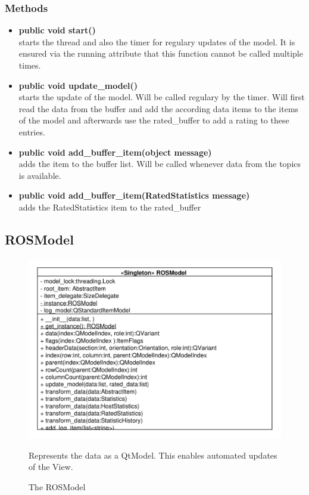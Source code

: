 \subsubsection{Methods}
\begin{itemize}
  \item \textbf{public void start()}\\
  starts the thread and also the timer for regulary updates of the model. It is ensured via the running attribute that this function cannot be called multiple times.
  \item \textbf{public void update\_model()}\\ 
  starts the update of the model. Will be called regulary by the timer. Will first read the data from the buffer and add the according data items to the items of the model and afterwards use the rated\_buffer to add a rating to these entries.
  \item \textbf{public void add\_buffer\_item(object message)}\\ 
  adds the item to the buffer list. Will be called whenever data from the topics
  is available.
  \item \textbf{public void add\_buffer\_item(RatedStatistics message)}\\
  adds the RatedStatistics item to the rated\_buffer
\end{itemize}

\subsection{ROSModel}
\begin{figure}[htbp]
	\begin{minipage}[t]{7cm}
		\vspace{0pt}
		\centering
		\includegraphics[scale=0.6]{./diagram_pictures/ROSModel.pdf}
		\caption{The ROSModel}
	\end{minipage}
	\hfill
	\begin{minipage}[t]{6cm}
		\vspace{10pt}		
		Represents the data as a QtModel. This enables automated updates of the View.
	\end{minipage}
\end{figure}
